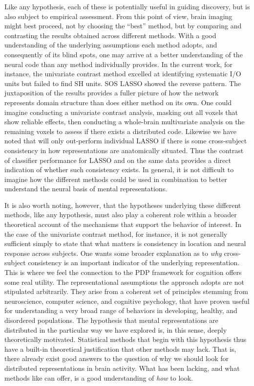 Like any hypothesis, each of these is potentially useful in guiding discovery, but is also subject to empirical assessment. From this point of view, brain imaging might best proceed, not by choosing the ``best'' method, but by comparing and contrasting the results obtained across different methods. With a good understanding of the underlying assumptions each method adopts, and consequently of its blind spots, one may arrive at a better understanding of the neural code than any method individually provides. In the current work, for instance, the univariate contrast method excelled at identifying systematic I/O units but failed to find SH units. SOS LASSO showed the reverse pattern. The juxtaposition of the results provides a fuller picture of how the network represents domain structure than does either method on its own. One could imagine conducting a univariate contrast analysis, masking out all voxels that show reliable effects, then conducting a whole-brain multivariate analysis on the remaining voxels to assess if there exists a distributed code. Likewise we have noted that \soslasso will only out-perform individual LASSO if there is some cross-subject consistency in how representations are anatomically situated. Thus the contrast of classifier performance for LASSO and \soslasso on the same data provides a direct indication of whether such consistency exists. In general, it is not difficult to imagine how the different methods could be used in combination to better understand the neural basis of mental representations.

It is also worth noting, however, that the hypotheses underlying these different methods, like any hypothesis, must also play a coherent role within a broader theoretical account of the mechanisms that support the behavior of interest. In the case of the univariate contrast method, for instance, it is not generally sufficient simply to state that what matters is consistency in location and neural response across subjects. One wants some broader explanation as to {\em why} cross-subject consistency is an important indicator of the underlying representation. This is where we feel the connection to the PDP framework for cognition offers some real utility. The representational assumptions the approach adopts are not stipulated arbitrarily. They arise from a coherent set of principles stemming from neuroscience, computer science, and cognitive psychology, that have proven useful for understanding a very broad range of behaviors in developing, healthy, and disordered populations. The hypothesis that mental representations are distributed in the particular way we have explored is, in this sense, deeply theoretically motivated. Statistical methods that begin with this hypothesis thus have a built-in theoretical justification that other methods may lack. That is, there already exist good answers to the question of why we should look for distributed representations in brain activity. What has been lacking, and what methods like \soslasso can offer, is a good understanding of {\em how} to look.

 
